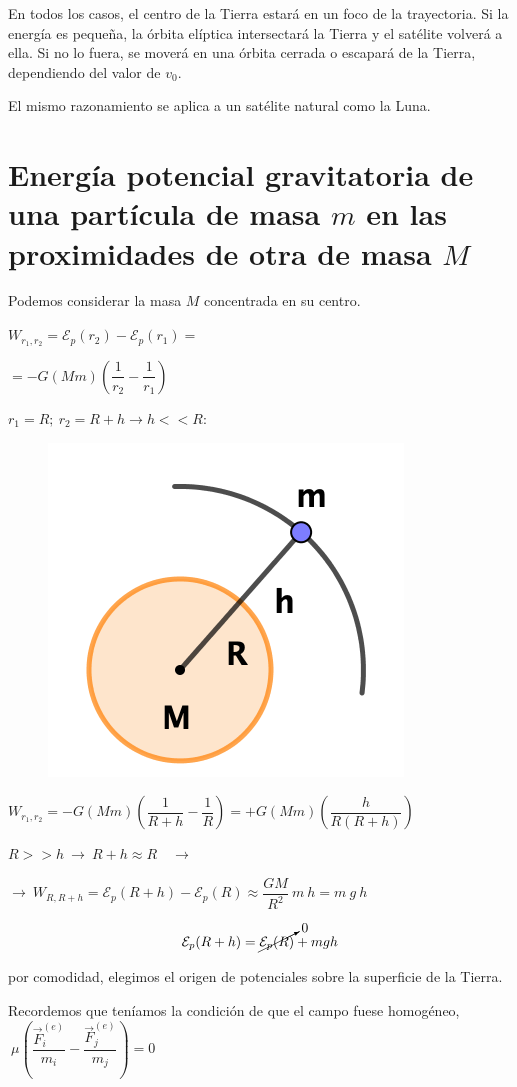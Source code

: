 En todos los casos, el centro de la Tierra estará en un foco de la trayectoria. Si la energía es pequeña, la órbita elíptica intersectará la Tierra y el satélite volverá a ella. Si no lo fuera, se moverá en una órbita cerrada o escapará de la Tierra, dependiendo del valor de $v_0$.

El mismo razonamiento se aplica a un satélite natural como la Luna.

\section[Energía potencial gravitatoria de una partícula de masa $m$ en las proximidades de otra de masa $M$]{Energía potencial gravitatoria de una partícula de masa $m$ en las proximidades de otra de masa $M$}

\begin{multicols}{2}
Podemos considerar la masa $M$ concentrada en su centro.

$W_{r_1,r_2}=\mathcal E_{p}(r_2)-\mathcal E_{p}(r_1)=$

$=-G(Mm)\left( \dfrac 1 {r_2} - \dfrac 1 {r_1} \right)$

$r_1=R;\ r_2=R+h \to h<<R: $
\begin{figure}[H]
	\centering
	\includegraphics[width=.25\textwidth]{imagenes/imagenes15/T15IM03.png}
\end{figure}	
\end{multicols}

$W_{r_1,r_2}=-G(Mm)\left( \dfrac 1 {R+h} - \dfrac 1 {R} \right)= +G(Mm)\left( \dfrac{h}{R(R+h)} \right)$

$R>>h \ \to \ R+h \approx R \quad \to \ $

$\to \ W_{R,R+h}=\mathcal E_{p}(R+h)-\mathcal E_{p}(R)\approx \dfrac{GM}{R^2}\ m \ h=m\ g \ h$

$$\mathcal E_p(R+h)=\cancelto{0}{\mathcal E_p(R)}+mgh$$ 

por comodidad, elegimos el origen de potenciales sobre la superficie de la Tierra.
 
 
 Recordemos que teníamos la condición de que el campo fuese homogéneo,  $\ \mu \left( \dfrac{\vec F_i^{(e)}}{m_i} - \dfrac{\vec F_j^{(e)}}{m_j} \right)=0$
 
